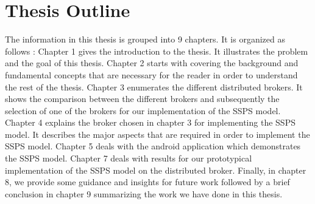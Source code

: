 \section{Thesis Outline}

The information in this thesis is grouped into 9 chapters. It is organized as follows : Chapter 1 gives the introduction to the thesis. It illustrates the problem and the goal of this thesis. Chapter 2 starts with covering the background and fundamental concepts that are necessary for the reader in order to understand the rest of the thesis. Chapter 3 enumerates the different distributed brokers. It shows the comparison between the different brokers and subsequently the selection of one of the brokers for our implementation of the SSPS model. Chapter 4 explains the broker chosen in chapter 3 for implementing the SSPS model. It describes the major aspects that are required in order to implement the SSPS model. Chapter 5 deals with the android application which demonstrates the SSPS model. Chapter 7 deals with results for our prototypical implementation of the SSPS model on the distributed broker. Finally, in chapter 8, we provide some guidance and insights for future work followed by a brief conclusion in chapter 9 summarizing the work we have done in this thesis.
